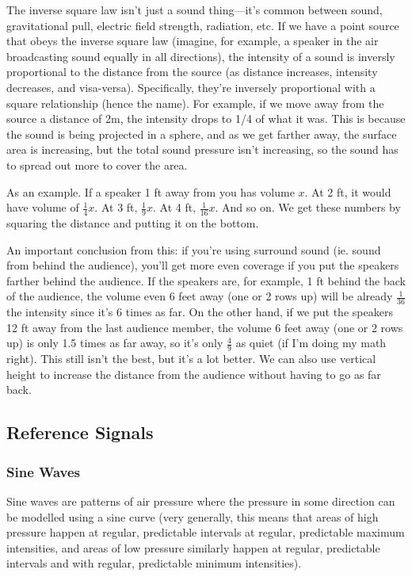 \documentclass[a4paper]{article}
\begin{document}
The inverse square law isn't just a sound thing---it's common between sound,
gravitational pull, electric field strength, radiation, etc. If we have a point
source that obeys the inverse square law (imagine, for example, a speaker in
the air broadcasting sound equally in all directions), the intensity of a sound
is inversly proportional to the distance from the source (as distance
increases, intensity decreases, and visa-versa). Specifically, they're
inversely proportional with a square relationship (hence the name). For
example, if we move away from the source a distance of 2m, the intensity drops
to 1/4 of what it was. This is because the sound is being projected in a
sphere, and as we get farther away, the surface area is increasing, but the
total sound pressure isn't increasing, so the sound has to spread out more to
cover the area.

As an example. If a speaker 1 ft away from you has volume $x$. At 2 ft, it
would have volume of $\frac{1}{4}x$. At 3 ft, $\frac{1}{9}x$. At 4 ft,
$\frac{1}{16}x$. And so on. We get these numbers by squaring the distance and
putting it on the bottom.

An important conclusion from this: if you're using surround sound (ie. sound
from behind the audience), you'll get more even coverage if you put the
speakers farther behind the audience. If the speakers are, for example, 1 ft
behind the back of the audience, the volume even 6 feet away (one or 2 rows up)
will be already $\frac{1}{36}$ the intensity since it's 6 times as far.
On the other hand, if we put the
speakers 12 ft away from the last audience member, the volume 6 feet away (one
or 2 rows up) is only 1.5 times as far away, so it's only $\frac{4}{9}$ as
quiet (if I'm doing my math right). This still isn't the best, but it's a lot
better. We can also use vertical height to increase the distance from the
audience without having to go as far back.

\subsection{Reference Signals}
\subsubsection{Sine Waves}
Sine waves are patterns of air pressure where the pressure in some direction
can be modelled using a sine curve (very generally, this means that areas of
high pressure happen at regular, predictable intervals at regular, predictable
maximum intensities, and areas of low pressure similarly happen at regular,
predictable intervals and with regular, predictable minimum intensities).
\end{document}
